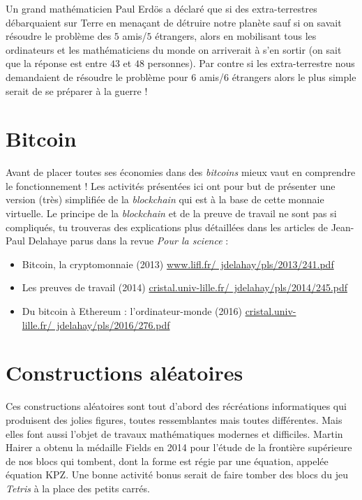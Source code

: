 \documentclass[11pt,class=report,crop=false]{standalone}
\begin{document}
Un grand mathématicien Paul Erd\"os a déclaré que si des extra-terrestres débarquaient sur Terre en menaçant de détruire notre planète sauf si on savait résoudre le problème des $5$ amis/$5$ étrangers, alors en mobilisant tous les ordinateurs et les mathématiciens du monde on arriverait à s'en sortir (on sait que la réponse est entre $43$ et $48$ personnes). Par contre si les extra-terrestre nous demandaient de résoudre le problème pour $6$ amis/$6$ étrangers alors le plus simple serait de se préparer à la guerre !


\section{Bitcoin}

Avant de placer toutes ses économies dans des \emph{bitcoins} mieux vaut en comprendre le fonctionnement ! Les activités présentées ici ont pour but de présenter une version (très) simplifiée de la \emph{blockchain} qui est à la base de cette monnaie virtuelle.
Le principe de la \emph{blockchain} et de la preuve de travail ne sont pas si compliqués, tu trouveras des explications plus détaillées dans les articles de Jean-Paul Delahaye parus dans la revue \emph{Pour la science} :
\begin{itemize}
  \item Bitcoin, la cryptomonnaie (2013) 
  \href{http://www.lifl.fr/~jdelahay/pls/2013/241.pdf}{www.lifl.fr/~jdelahay/pls/2013/241.pdf}
  \item Les preuves de travail (2014) 
  \href{http://cristal.univ-lille.fr/~jdelahay/pls/2014/245.pdf}{cristal.univ-lille.fr/~jdelahay/pls/2014/245.pdf}
  \item Du bitcoin à Ethereum : l’ordinateur-monde (2016)
  \href{http://cristal.univ-lille.fr/~jdelahay/pls/2016/276.pdf}{cristal.univ-lille.fr/~jdelahay/pls/2016/276.pdf}
\end{itemize}



\section{Constructions aléatoires}

Ces constructions aléatoires sont tout d'abord des récréations informatiques qui produisent des jolies figures, toutes ressemblantes mais toutes différentes. Mais elles font aussi l'objet de travaux mathématiques modernes et difficiles. Martin Hairer a obtenu la médaille Fields en 2014 pour l'étude de la frontière supérieure de nos blocs qui tombent, dont la forme est régie par une équation, appelée \og{}équation KPZ\fg{}.
Une bonne activité bonus serait de faire tomber des blocs du jeu \emph{Tetris} à la place des petits carrés.
\end{document}
